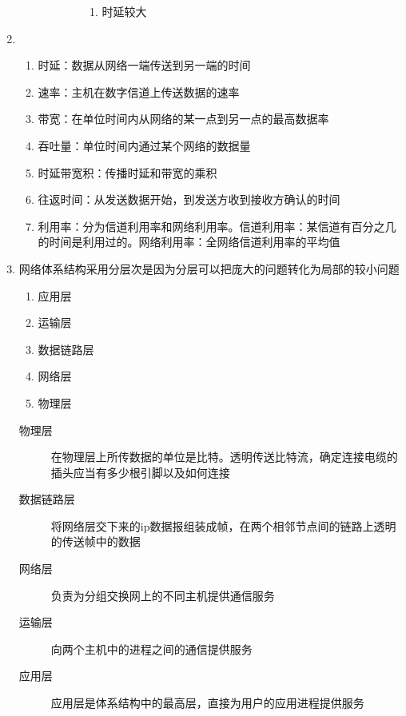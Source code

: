 \documentclass{article}
\begin{document}
\begin{enumerate}
\begin{description}
\begin{description}
\begin{enumerate}
                \item 时延较大
            \end{enumerate}
        \end{description}
    \end{description}
    \item \begin{enumerate}[label=(\arabic*)]
        \item 时延：数据从网络一端传送到另一端的时间
        \item 速率：主机在数字信道上传送数据的速率
        \item 带宽：在单位时间内从网络的某一点到另一点的最高数据率
        \item 吞吐量：单位时间内通过某个网络的数据量
        \item 时延带宽积：传播时延和带宽的乘积
        \item 往返时间：从发送数据开始，到发送方收到接收方确认的时间
        \item 利用率：分为信道利用率和网络利用率。信道利用率：某信道有百分之几的时间是利用过的。网络利用率：全网络信道利用率的平均值
    \end{enumerate}
    \item 网络体系结构采用分层次是因为分层可以把庞大的问题转化为局部的较小问题\newline
          \begin{enumerate}
            \item 应用层
            \item 运输层
            \item 数据链路层
            \item 网络层
            \item 物理层
          \end{enumerate}
          \begin{description}
            \item[物理层] 在物理层上所传数据的单位是比特。透明传送比特流，确定连接电缆的插头应当有多少根引脚以及如何连接
            \item[数据链路层] 将网络层交下来的ip数据报组装成帧，在两个相邻节点间的链路上透明的传送帧中的数据
            \item[网络层] 负责为分组交换网上的不同主机提供通信服务
            \item[运输层] 向两个主机中的进程之间的通信提供服务
            \item[应用层] 应用层是体系结构中的最高层，直接为用户的应用进程提供服务  
          \end{description}

\end{enumerate}
\end{document}

